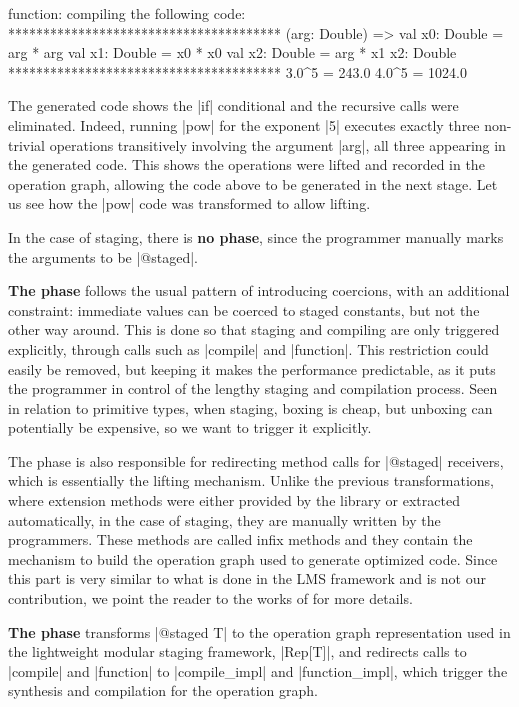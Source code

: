 \begin{lstlisting-nobreak}
 function: compiling the following code:
 ***************************************
   (arg: Double) => {
     val x0: Double = arg * arg
     val x1: Double = x0 * x0
     val x2: Double = arg * x1
     x2: Double
   }
 ***************************************
 3.0^5 = 243.0
 4.0^5 = 1024.0
\end{lstlisting-nobreak}

The generated code shows the |if| conditional and the recursive calls were eliminated. Indeed, running |pow| for the exponent |5| executes exactly three non-trivial operations transitively involving the argument |arg|, all three appearing in the generated code. This shows the operations were lifted and recorded in the operation graph, allowing the code above to be generated in the next stage. Let us see how the |pow| code was transformed to allow lifting.

In the case of staging, there is \textbf{no \inject{} phase}, since the programmer manually marks the arguments to be |@staged|.

\textbf{The \coerce{} phase} follows the usual pattern of introducing coercions, with an additional constraint: immediate values can be coerced to staged constants, but not the other way around. This is done so that staging and compiling are only triggered explicitly, through calls such as |compile| and |function|. This restriction could easily be removed, but keeping it makes the performance predictable, as it puts the programmer in control of the lengthy staging and compilation process. Seen in relation to primitive types, when staging, boxing is cheap, but unboxing can potentially be expensive, so we want to trigger it explicitly.

The \coerce{} phase is also responsible for redirecting method calls for |@staged| receivers, which is essentially the lifting mechanism. Unlike the previous transformations, where extension methods were either provided by the library or extracted automatically, in the case of staging, they are manually written by the programmers. These methods are called infix methods \cite{scala-virtualized} and they contain the mechanism to build the operation graph used to generate optimized code. Since this part is very similar to what is done in the LMS framework and is not our contribution, we point the reader to the works of  \cite{tiark-lms, tiark-building-blocks, tiark-thesis} for more details.

\textbf{The \commit{} phase} transforms |@staged T| to the operation graph representation used in the lightweight modular staging framework, |Rep[T]|, and redirects calls to |compile| and |function| to |compile_impl| and |function_impl|, which trigger the synthesis and compilation for the operation graph.

